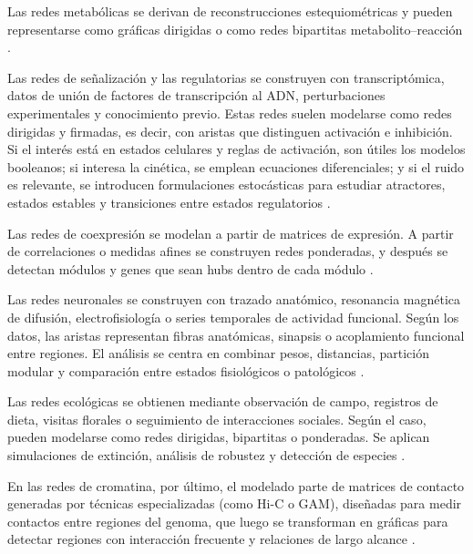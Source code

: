 \documentclass[11pt]{article}
\begin{document}
Las redes metabólicas se derivan de reconstrucciones estequiométricas y pueden representarse como gráficas dirigidas o como redes bipartitas metabolito--reacción \parencite{Koutrouli2020}.

Las redes de señalización y las regulatorias se construyen con transcriptómica, datos de unión de factores de transcripción al ADN, perturbaciones experimentales y conocimiento previo. Estas redes suelen modelarse como redes dirigidas y firmadas, es decir, con aristas que distinguen activación e inhibición. Si el interés está en estados celulares y reglas de activación, son útiles los modelos booleanos; si interesa la cinética, se emplean ecuaciones diferenciales; y si el ruido es relevante, se introducen formulaciones estocásticas para estudiar atractores, estados estables y transiciones entre estados regulatorios \parencite{Elowitz2002,Kauffman1969,BanfRhee2017,EmmertStreib2014}.


Las redes de coexpresión se modelan a partir de matrices de expresión. A partir de correlaciones o medidas afines se construyen redes ponderadas, y después se detectan módulos y genes que sean hubs dentro de cada módulo \parencite{ZhangHorvath2005}. 

Las redes neuronales se construyen con trazado anatómico, resonancia magnética de difusión, electrofisiología o series temporales de actividad funcional. Según los datos, las aristas representan fibras anatómicas, sinapsis o acoplamiento funcional entre regiones. El análisis se centra en combinar pesos, distancias, partición modular y comparación entre estados fisiológicos o patológicos \parencite{BullmoreSporns2009}.

Las redes ecológicas se obtienen mediante observación de campo, registros de dieta, visitas florales o seguimiento de interacciones sociales. Según el caso, pueden modelarse como redes dirigidas, bipartitas o ponderadas. Se aplican simulaciones de extinción, análisis de robustez y detección de especies \parencite{Olesen2007,Memmott2004,Bascompte2009}. 

En las redes de cromatina, por último, el modelado parte de matrices de contacto generadas por técnicas especializadas (como Hi-C o GAM), diseñadas para medir contactos entre regiones del genoma, que luego se transforman en gráficas para detectar regiones con interacción frecuente y relaciones de largo alcance \parencite{Beagrie2017}.
\end{document}
